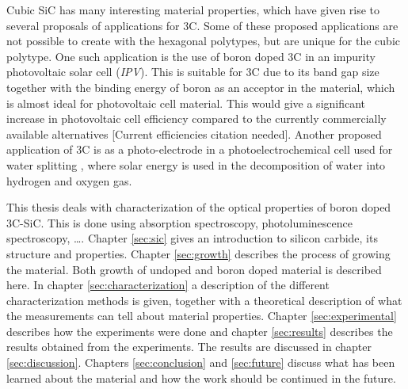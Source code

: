 Cubic SiC has many interesting material properties, which have given rise to several proposals of applications for 3C. Some of these proposed applications are not possible to create with the hexagonal polytypes, but are unique for the cubic polytype. One such application is the use of boron doped 3C in an impurity photovoltaic solar cell (\emph{IPV}). This is suitable for 3C due to its band gap size together with the binding energy of boron as an acceptor in the material, which is almost ideal for photovoltaic cell material. This would give a significant increase in photovoltaic cell efficiency compared to the currently commercially available alternatives \cite{Richards2003}[Current efficiencies citation needed]. Another proposed application of 3C is as a photo-electrode in a photoelectrochemical cell used for water splitting \cite{Kato2014,Yasuda2012}, where solar energy is used in the decomposition of water into hydrogen and oxygen gas. 

This thesis deals with characterization of the optical properties of boron doped 3C-SiC. This is done using absorption spectroscopy, photoluminescence spectroscopy, \dots. Chapter \ref{sec:sic} gives an introduction to silicon carbide, its structure and properties. Chapter \ref{sec:growth} describes the process of growing the material. Both growth of undoped and boron doped material is described here. In chapter \ref{sec:characterization} a description of the different characterization methods is given, together with a theoretical description of what the measurements can tell about material properties. Chapter \ref{sec:experimental} describes how the experiments were done and chapter \ref{sec:results} describes the results obtained from the experiments. The results are discussed in chapter \ref{sec:discussion}. Chapters \ref{sec:conclusion} and \ref{sec:future} discuss what has been learned about the material and how the work should be continued in the future. 



































